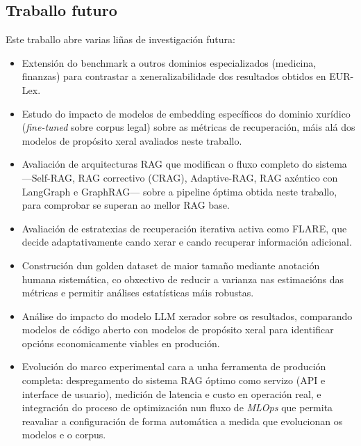 \documentclass[11pt, a4paper, oneside]{report}
\begin{document}
\subsection*{Traballo futuro}

Este traballo abre varias liñas de investigación futura:

\begin{itemize}
  \item Extensión do benchmark a outros dominios especializados (medicina, finanzas)
    para contrastar a xeneralizabilidade dos resultados obtidos en EUR-Lex.
  \item Estudo do impacto de modelos de embedding específicos do dominio xurídico
    (\textit{fine-tuned} sobre corpus legal) sobre as métricas de recuperación, máis
    alá dos modelos de propósito xeral avaliados neste traballo.
  \item Avaliación de arquitecturas RAG que modifican o fluxo completo do sistema
    —Self-RAG, RAG correctivo (CRAG), Adaptive-RAG, RAG axéntico con LangGraph e
    GraphRAG— sobre a pipeline óptima obtida neste traballo, para comprobar se superan
    ao mellor RAG base.
  \item Avaliación de estratexias de recuperación iterativa activa como FLARE, que
    decide adaptativamente cando xerar e cando recuperar información adicional.
  \item Construción dun golden dataset de maior tamaño mediante anotación humana
    sistemática, co obxectivo de reducir a varianza nas estimacións das métricas e
    permitir análises estatísticas máis robustas.
  \item Análise do impacto do modelo LLM xerador sobre os resultados, comparando
    modelos de código aberto con modelos de propósito xeral para identificar opcións
    economicamente viables en produción.
  \item Evolución do marco experimental cara a unha ferramenta de produción completa:
    despregamento do sistema RAG óptimo como servizo (API e interface de usuario),
    medición de latencia e custo en operación real, e integración do proceso de
    optimización nun fluxo de \textit{MLOps} que permita reavaliar a configuración de
    forma automática a medida que evolucionan os modelos e o corpus.
\end{itemize}

\printbibliography[heading=bibintoc, title={Bibliografía}]
\end{document}
